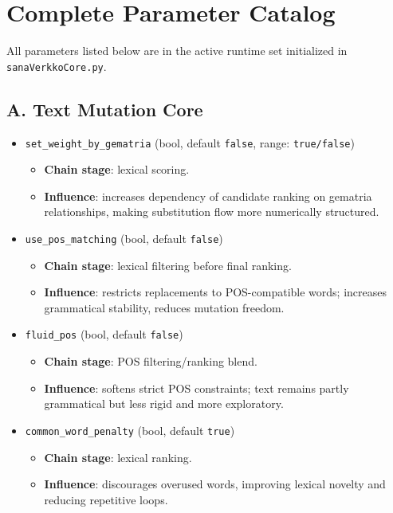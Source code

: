 \documentclass[11pt,a4paper]{article}
\begin{document}
\section{Complete Parameter Catalog}
All parameters listed below are in the active runtime set initialized in \texttt{sanaVerkkoCore.py}.

\subsection*{A. Text Mutation Core}
\begin{itemize}
  \item \texttt{set\_weight\_by\_gematria} (bool, default \texttt{false}, range: \texttt{true/false})
  \begin{itemize}
    \item \textbf{Chain stage}: lexical scoring.
    \item \textbf{Influence}: increases dependency of candidate ranking on gematria relationships, making substitution flow more numerically structured.
  \end{itemize}

  \item \texttt{use\_pos\_matching} (bool, default \texttt{false})
  \begin{itemize}
    \item \textbf{Chain stage}: lexical filtering before final ranking.
    \item \textbf{Influence}: restricts replacements to POS-compatible words; increases grammatical stability, reduces mutation freedom.
  \end{itemize}

  \item \texttt{fluid\_pos} (bool, default \texttt{false})
  \begin{itemize}
    \item \textbf{Chain stage}: POS filtering/ranking blend.
    \item \textbf{Influence}: softens strict POS constraints; text remains partly grammatical but less rigid and more exploratory.
  \end{itemize}

  \item \texttt{common\_word\_penalty} (bool, default \texttt{true})
  \begin{itemize}
    \item \textbf{Chain stage}: lexical ranking.
    \item \textbf{Influence}: discourages overused words, improving lexical novelty and reducing repetitive loops.
  \end{itemize}


\end{itemize}
\end{document}
